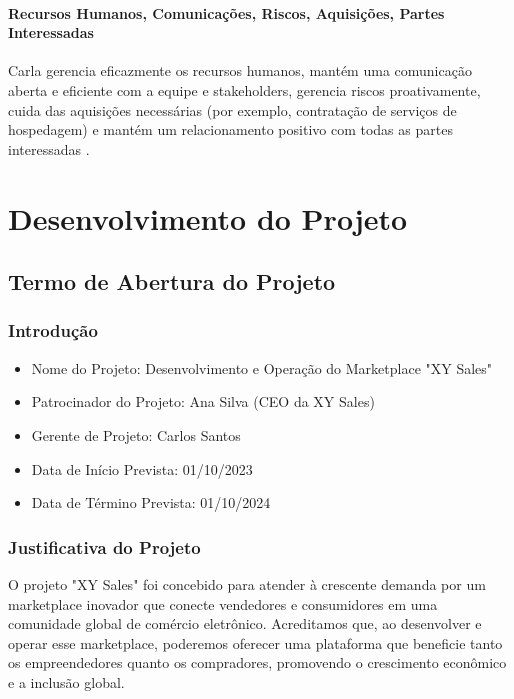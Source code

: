 \documentclass[
	12pt,				%
	openright,			%
	twoside,			%
	a4paper,			%
	english,			%
	brazil				%
	]{abntex2}
\begin{document}
\subsection{Recursos Humanos, Comunicações, Riscos, Aquisições, Partes Interessadas}
Carla gerencia eficazmente os recursos humanos, mantém uma comunicação aberta e eficiente com a equipe e stakeholders, gerencia riscos proativamente, cuida das aquisições necessárias (por exemplo, contratação de serviços de hospedagem) e mantém um relacionamento positivo com todas as partes interessadas .



\part{Desenvolvimento do Projeto}

\chapter{Termo de Abertura do Projeto}\label{cap_termo_de_abertura_do_projeto}

\section{Introdução}
\begin{itemize}
    \item Nome do Projeto: Desenvolvimento e Operação do Marketplace "XY Sales"
    \item Patrocinador do Projeto: Ana Silva (CEO da XY Sales)
    \item Gerente de Projeto: Carlos Santos
    \item Data de Início Prevista: 01/10/2023
    \item Data de Término Prevista: 01/10/2024
\end{itemize}

\section{Justificativa do Projeto}
O projeto "XY Sales" foi concebido para atender à crescente demanda por um marketplace inovador que conecte vendedores e consumidores em uma comunidade global de comércio eletrônico. Acreditamos que, ao desenvolver e operar esse marketplace, poderemos oferecer uma plataforma que beneficie tanto os empreendedores quanto os compradores, promovendo o crescimento econômico e a inclusão global.
\end{document}
